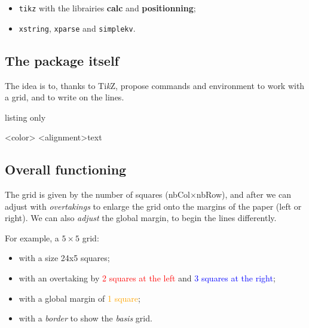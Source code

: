 \documentclass[a4paper]{article}
\newcommand\tikzlogo{Ti\textit{k}Z}
\let\TikZ\tikzlogo
\newcommand\Cle[1]{{\bfseries\sffamily\textlangle #1\textrangle}}
\begin{document}
\begin{itemize}
	\item \texttt{tikz} with the librairies \Cle{calc} and \Cle{positionning};
	\item \texttt{xstring}, \texttt{xparse} and \texttt{simplekv}.
\end{itemize}

\subsection{The package itself}

The idea is to, thanks to \TikZ, propose commands and environment to work with a grid, and to write on the lines.

\begin{PresentationCode}{listing only}

\begin{EnvGrid}[keys]<color>
	\WriteLine[keys]<alignment>{text}
	\PassLine
\end{EnvGrid}
\end{PresentationCode}

\subsection{Overall functioning}

The grid is given by the number of squares (nbCol$\times$nbRow), and after we can adjust with \textit{overtakings} to enlarge the grid onto the margins of the paper (left or right). We can also \textit{adjust} the global margin, to begin the lines differently.

\medskip

For example, a $5\times5$ grid:

\begin{itemize}
	\item with a size 24x5 squares;
	\item with an overtaking by \textcolor{red}{2 squares at the left} and \textcolor{blue}{3 squares at the right};
	\item with a global margin of \textcolor{orange}{1 square};
	\item with a \textcolor{green!50!black}{\textit{border}} to show the \textit{basis} grid.
\end{itemize}

\medskip
\end{document}
